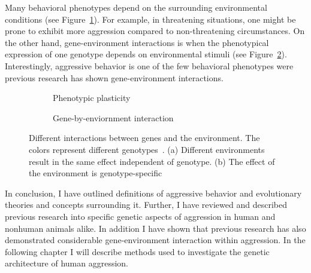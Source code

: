 Many behavioral phenotypes depend on the surrounding environmental conditions (see Figure~\ref{fig:plasticity}).
For example, in threatening situations, one might be prone to exhibit more aggression compared to non-threatening circumstances. 
On the other hand, gene-environment interactions is when the phenotypical expression of one genotype depends on environmental stimuli (see Figure~\ref{fig:gene_env_interaction}).
Interestingly, aggressive behavior is one of the few behavioral phenotypes were previous research has shown gene-environment interactions.

\begin{figure}[!htp]
  \centering
  \begin{subfigure}[t]{0.4\textwidth}
    \centering
    \resizebox{\linewidth}{!}{}
    \caption{Phenotypic plasticity}\label{fig:plasticity}
  \end{subfigure}
  \begin{subfigure}[t]{0.4\textwidth}
    \centering
    \resizebox{\linewidth}{!}{}
    \caption{Gene-by-enviornment interaction}\label{fig:gene_env_interaction}
  \end{subfigure}
  \caption[Gene-Environment Interactions]{Different interactions between genes and the environment. 
    The colors represent different genotypes~\cite{Anholt2012}. 
    (a) Different environments result in the same effect independent of genotype.
    (b) The effect of the environment is genotype-specific}\label{fig:env_interactions}
\end{figure}

\bigskip

In conclusion, I have outlined definitions of aggressive behavior and evolutionary theories and concepts surrounding it.
Further, I have reviewed and described previous research into specific genetic aspects of aggression in human and nonhuman animals alike.
In addition I have shown that previous research has also demonstrated considerable gene-environment interaction within aggression.
In the following chapter I will describe methods used to investigate the genetic architecture of human aggression.
